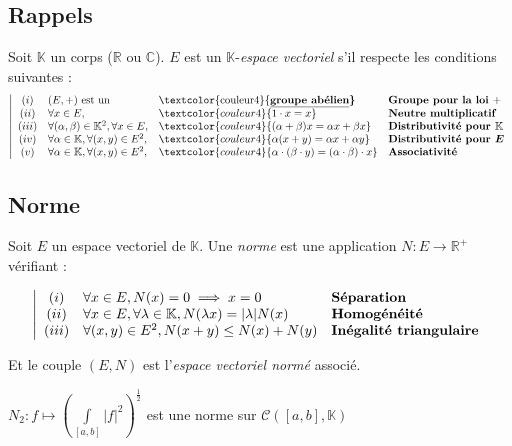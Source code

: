 \documentclass[11pt,a4paper,fleqn,pdftex]{report}
\begin{document}
\subsection{Rappels} %
\label{sub:rappels}
\begin{dfn}
     Soit $\mathbb{K}$ un corps ($\mathbb{R}$ ou $\mathbb{C}$).\newline
     $E$ est un $\mathbb{K}$-\emph{espace vectoriel} s'il respecte les conditions suivantes : 
     \begin{equation}
        \left| 
      \begin{array}{c l l l}
       (i)  &(E,+) \text{ est un }&\text{\textcolor{couleur4}{\bf\underline{groupe abélien}}}&\textbf{Groupe pour la loi }+\\
       (ii) &\forall x\in E,& \textcolor{couleur4}{{1\cdot x = x}}&\textbf{Neutre multiplicatif}\\
       (iii) &\forall (\alpha, \beta) \in \mathbb{K}^2, \forall x\in E,& \textcolor{couleur4}{{(\alpha + \beta) x = \alpha x + \beta x}} &\textbf{Distributivité pour }\boldsymbol{\mathbb{K}} \\
       (iv) &\forall \alpha \in \mathbb{K}, \forall (x,y) \in E^2,& \textcolor{couleur4}{{\alpha (x+y) = \alpha x + \alpha y}} &\textbf{Distributivité pour }\boldsymbol{E}\\
       (v) &\forall \alpha \in \mathbb{K}, \forall (x,y) \in E^2,& \textcolor{couleur4}{{\alpha \cdot (\beta \cdot y) = (\alpha \cdot \beta ) \cdot x}} &\textbf{Associativité}
      \end{array}
        \right.
     \end{equation}
     
\end{dfn}
\subsection{Norme}
\begin{dfn}
Soit $E$ un espace vectoriel de
$\mathbb{K}$. Une \emph{norme} 
est une application $N : E \to \mathbb{R}^+$ vérifiant : 

\begin{equation}
\left| 
\begin{array}{c l l}
(i)&\forall x \in E, N(x)=0 \implies x=0 &\textbf{Séparation}\\
(ii)&\forall x \in E, \forall \lambda \in \mathbb{K}, N(\lambda x)=|\lambda|N(x) &\textbf{Homogénéité}\\
(iii)&\forall (x,y) \in E^2, N(x+y)\le N(x)+N(y)&\textbf{Inégalité triangulaire}\\
\end{array}
\right.
\end{equation}

Et le couple $(E,N)$ est l'\emph{espace
vectoriel normé} associé.
\end{dfn}
\begin{theorem}
$N_2 : f \mapsto \left( \int \limits_{[a,b]} |f|^2 \right)^{\frac{1}{2}}$ est une norme sur $\mathcal{C}\left( [a,b], \mathbb{K} \right)$
\end{theorem}
\end{document}
